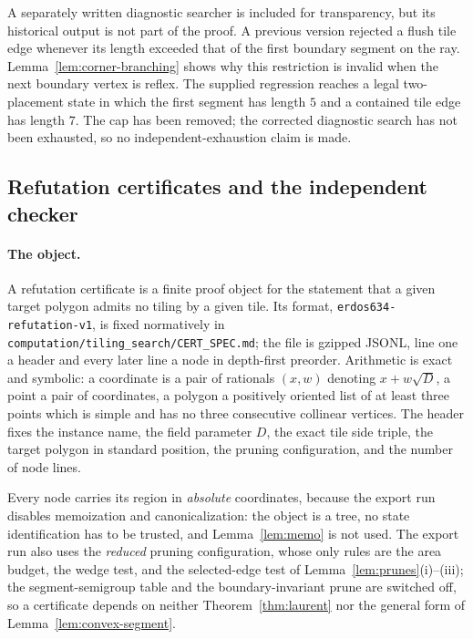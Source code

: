 \documentclass[11pt]{amsart}
\theoremstyle{definition}
\theoremstyle{remark}
\newcommand{\pathcode}[1]{\nolinkurl{#1}}
\begin{document}
A separately written diagnostic searcher is included for transparency, but
its historical output is not part of the proof.  A previous version rejected
a flush tile edge whenever its length exceeded that of the first boundary
segment on the ray.  Lemma~\ref{lem:corner-branching} shows why this
restriction is invalid when the next boundary vertex is reflex.  The supplied
regression reaches a legal two-placement state in which the first segment has
length $5$ and a contained tile edge has length $7$.  The cap has been
removed; the corrected diagnostic search has not been exhausted, so no
independent-exhaustion claim is made.

\subsection{Refutation certificates and the independent
checker}\label{app:certificates}

\paragraph{The object.}
A refutation certificate is a finite proof object for the statement that a
given target polygon admits no tiling by a given tile.  Its format,
\texttt{erdos634-refutation-v1}, is fixed normatively in
\pathcode{computation/tiling_search/CERT_SPEC.md}; the file is gzipped JSONL,
line one a header and every later line a node in depth-first preorder.
Arithmetic is exact and symbolic: a coordinate is a pair of rationals
$(x,w)$ denoting $x+w\sqrt D$, a point a pair of coordinates, a polygon a
positively oriented list of at least three points which is simple and has no
three consecutive collinear vertices.  The header fixes the instance name,
the field parameter $D$, the exact tile side triple, the target polygon in
standard position, the pruning configuration, and the number of node lines.

Every node carries its region in \emph{absolute} coordinates, because the
export run disables memoization and canonicalization: the object is a tree,
no state identification has to be trusted, and Lemma~\ref{lem:memo} is not
used.  The export run also uses the \emph{reduced} pruning configuration,
whose only rules are the area budget, the wedge test, and the selected-edge
test of Lemma~\ref{lem:prunes}(i)--(iii); the segment-semigroup table and the
boundary-invariant prune are switched off, so a certificate depends on
neither Theorem~\ref{thm:laurent} nor the general form of
Lemma~\ref{lem:convex-segment}.
\end{document}

